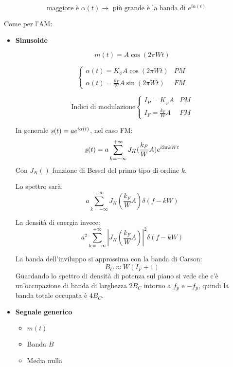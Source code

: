\documentclass{article}
\newcommand{\ubar}[1]{\underaccent{\bar}{#1}}
\begin{document}
$$\text{maggiore è }\alpha(t)\rightarrow\text{ più grande è la banda di }e^{i\alpha(t)}$$

\newpage

\noindent Come per l'AM:
\begin{itemize}
    \item \textbf{Sinusoide}

        $$m(t)=A\cos(2\pi Wt)$$

        \[\begin{cases}
            \alpha(t)=K_\phi A\cos(2\pi Wt) & PM\\
            \alpha(t)=\frac{k_F}{W}A\sin(2\pi Wt) & FM
        \end{cases}\]

        \[\text{Indici di modulazione}\begin{cases}
            I_P=K_\varphi A & PM\\
            I_F=\frac{k_F}{W}A & FM
        \end{cases}\]

        In generale $\ubar{s}(t)=ae^{i\alpha(t)}$, nel caso FM:
        $$\ubar{s}(t)=a\sum_{k=-\infty}^{+\infty}J_K(\frac{k_F}{W}A)e^{i2\pi kWt}$$
        Con $J_K()$ funzione di Bessel del primo tipo di ordine $k$.\newline

        Lo spettro sarà:
        $$a\sum_{k=-\infty}^{+\infty}J_K(\frac{k_F}{W}A)\delta(f-kW)$$\newline

        La densità di energia invece:
        $$a^2\sum_{k=-\infty}^{+\infty}|J_K(\frac{k_F}{W}A)|^2\delta(f-kW)$$\newline

        La banda dell'inviluppo si approssima con la banda di Carson:
        $$B_C\approx W(I_F+1)$$
        Guardando lo spettro di densità di potenza sul piano si vede che c'è un'occupazione di banda di larghezza $2B_C$ intorno a $f_p$ e $-f_p$, quindi la banda totale occupata è $4B_C$.

    \newpage
        
    \item \textbf{Segnale generico}
    
        \begin{itemize}
            \item $m(t)$
            \item Banda $B$
            \item Media nulla\newline
        \end{itemize}
    

\end{itemize}
\end{document}
